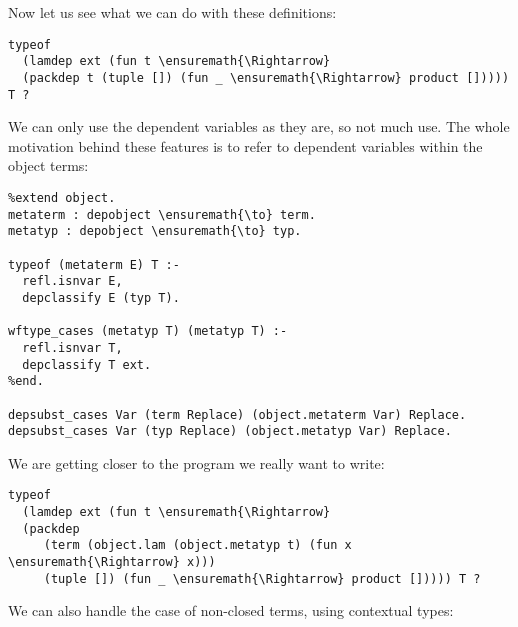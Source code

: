 Now let us see what we can do with these definitions:

\begin{verbatim}
typeof
  (lamdep ext (fun t \ensuremath{\Rightarrow}
  (packdep t (tuple []) (fun _ \ensuremath{\Rightarrow} product [])))) T ?
\end{verbatim}

We can only use the dependent variables as they are, so not much use.
The whole motivation behind these features is to refer to dependent
variables within the object terms:

\begin{verbatim}
%extend object.
metaterm : depobject \ensuremath{\to} term.
metatyp : depobject \ensuremath{\to} typ.

typeof (metaterm E) T :-
  refl.isnvar E,
  depclassify E (typ T).
  
wftype_cases (metatyp T) (metatyp T) :-
  refl.isnvar T,
  depclassify T ext.
%end.

depsubst_cases Var (term Replace) (object.metaterm Var) Replace.
depsubst_cases Var (typ Replace) (object.metatyp Var) Replace.
\end{verbatim}

We are getting closer to the program we really want to write:

\begin{verbatim}
typeof
  (lamdep ext (fun t \ensuremath{\Rightarrow}
  (packdep
     (term (object.lam (object.metatyp t) (fun x \ensuremath{\Rightarrow} x)))
     (tuple []) (fun _ \ensuremath{\Rightarrow} product [])))) T ?
\end{verbatim}

We can also handle the case of non-closed terms, using contextual types:

